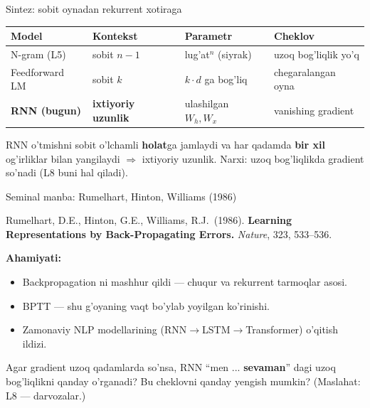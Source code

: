 \documentclass[aspectratio=169,11pt]{beamer}
\begin{document}
\begin{frame}{Sintez: sobit oynadan rekurrent xotiraga}
  \begin{center}\small
  \begin{tabular}{p{2.8cm}p{2.6cm}p{2.0cm}p{3.2cm}}
    \toprule
    \textbf{Model} & \textbf{Kontekst} & \textbf{Parametr} & \textbf{Cheklov} \\
    \midrule
    N-gram (L5) & sobit $n{-}1$ & lug'at$^n$ (siyrak) & uzoq bog'liqlik yo'q \\
    Feedforward LM & sobit $k$ & $k\cdot d$ ga bog'liq & chegaralangan oyna \\
    \textbf{RNN (bugun)} & \textbf{ixtiyoriy uzunlik} & ulashilgan $W_h,W_x$ & vanishing gradient \\
    \bottomrule
  \end{tabular}
  \end{center}
  \vspace{4pt}
  \begin{tcolorbox}[okbox,title=Asosiy g'oya,top=2pt,bottom=2pt]
    \footnotesize
    RNN o'tmishni sobit o'lchamli \textbf{holat}ga jamlaydi va har qadamda
    \textbf{bir xil} og'irliklar bilan yangilaydi $\Rightarrow$ ixtiyoriy uzunlik.
    Narxi: uzoq bog'liqlikda gradient so'nadi (L8 buni hal qiladi).
  \end{tcolorbox}
\end{frame}

\begin{frame}{Seminal manba: Rumelhart, Hinton, Williams (1986)}
  \begin{tcolorbox}[defbox,title=Manba]
    \small
    Rumelhart, D.E., Hinton, G.E., Williams, R.J.\ (1986). \textbf{Learning
    Representations by Back-Propagating Errors.} \textit{Nature}, 323, 533--536.
  \end{tcolorbox}
  \vspace{5pt}
  \textbf{Ahamiyati:}
  \begin{itemize}\small\setlength\itemsep{3pt}
    \item Backpropagation ni mashhur qildi --- chuqur va rekurrent tarmoqlar asosi.
    \item BPTT --- shu g'oyaning vaqt bo'ylab yoyilgan ko'rinishi.
    \item Zamonaviy NLP modellarining (RNN$\to$LSTM$\to$Transformer) o'qitish ildizi.
  \end{itemize}
  \vspace{5pt}
  \begin{tcolorbox}[warnbox,title=Muhokama savoli (P7 gacha o'ylang)]
    \small
    Agar gradient uzoq qadamlarda so'nsa, RNN ``men ... \textbf{sevaman}'' dagi
    uzoq bog'liqlikni qanday o'rganadi? Bu cheklovni qanday yengish mumkin?
    (Maslahat: L8 --- darvozalar.)
  \end{tcolorbox}
\end{frame}
\end{document}
